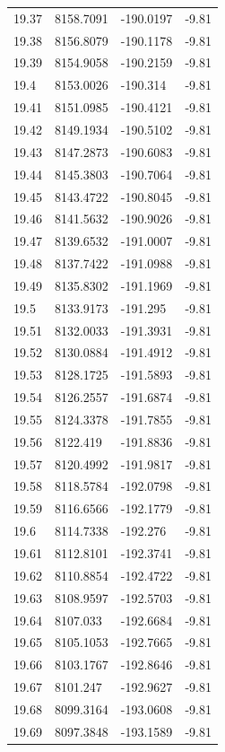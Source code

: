 \begin{table}[H]
\begin{tabular}{llll}
19.37 & 8158.7091 & -190.0197 & -9.81 \\
19.38 & 8156.8079 & -190.1178 & -9.81 \\
19.39 & 8154.9058 & -190.2159 & -9.81 \\
19.4 & 8153.0026 & -190.314 & -9.81 \\
19.41 & 8151.0985 & -190.4121 & -9.81 \\
19.42 & 8149.1934 & -190.5102 & -9.81 \\
19.43 & 8147.2873 & -190.6083 & -9.81 \\
19.44 & 8145.3803 & -190.7064 & -9.81 \\
19.45 & 8143.4722 & -190.8045 & -9.81 \\
19.46 & 8141.5632 & -190.9026 & -9.81 \\
19.47 & 8139.6532 & -191.0007 & -9.81 \\
19.48 & 8137.7422 & -191.0988 & -9.81 \\
19.49 & 8135.8302 & -191.1969 & -9.81 \\
19.5 & 8133.9173 & -191.295 & -9.81 \\
19.51 & 8132.0033 & -191.3931 & -9.81 \\
19.52 & 8130.0884 & -191.4912 & -9.81 \\
19.53 & 8128.1725 & -191.5893 & -9.81 \\
19.54 & 8126.2557 & -191.6874 & -9.81 \\
19.55 & 8124.3378 & -191.7855 & -9.81 \\
19.56 & 8122.419 & -191.8836 & -9.81 \\
19.57 & 8120.4992 & -191.9817 & -9.81 \\
19.58 & 8118.5784 & -192.0798 & -9.81 \\
19.59 & 8116.6566 & -192.1779 & -9.81 \\
19.6 & 8114.7338 & -192.276 & -9.81 \\
19.61 & 8112.8101 & -192.3741 & -9.81 \\
19.62 & 8110.8854 & -192.4722 & -9.81 \\
19.63 & 8108.9597 & -192.5703 & -9.81 \\
19.64 & 8107.033 & -192.6684 & -9.81 \\
19.65 & 8105.1053 & -192.7665 & -9.81 \\
19.66 & 8103.1767 & -192.8646 & -9.81 \\
19.67 & 8101.247 & -192.9627 & -9.81 \\
19.68 & 8099.3164 & -193.0608 & -9.81 \\
19.69 & 8097.3848 & -193.1589 & -9.81 \\

\end{tabular}
\end{table}
